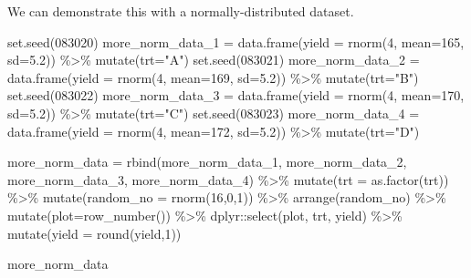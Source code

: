 \documentclass[
]{book}
\newenvironment{Shaded}{\begin{snugshade}}{\end{snugshade}}
\newcommand{\AttributeTok}[1]{\textcolor[rgb]{0.77,0.63,0.00}{#1}}
\newcommand{\DecValTok}[1]{\textcolor[rgb]{0.00,0.00,0.81}{#1}}
\newcommand{\FloatTok}[1]{\textcolor[rgb]{0.00,0.00,0.81}{#1}}
\newcommand{\FunctionTok}[1]{\textcolor[rgb]{0.00,0.00,0.00}{#1}}
\newcommand{\NormalTok}[1]{#1}
\newcommand{\OtherTok}[1]{\textcolor[rgb]{0.56,0.35,0.01}{#1}}
\newcommand{\SpecialCharTok}[1]{\textcolor[rgb]{0.00,0.00,0.00}{#1}}
\newcommand{\StringTok}[1]{\textcolor[rgb]{0.31,0.60,0.02}{#1}}
\begin{document}
We can demonstrate this with a normally-distributed dataset.

\begin{Shaded}
\begin{Highlighting}[]
\FunctionTok{set.seed}\NormalTok{(}\DecValTok{083020}\NormalTok{)}
\NormalTok{more\_norm\_data\_1 }\OtherTok{=} \FunctionTok{data.frame}\NormalTok{(}\AttributeTok{yield =} \FunctionTok{rnorm}\NormalTok{(}\DecValTok{4}\NormalTok{, }\AttributeTok{mean=}\DecValTok{165}\NormalTok{, }\AttributeTok{sd=}\FloatTok{5.2}\NormalTok{)) }\SpecialCharTok{\%\textgreater{}\%}
        \FunctionTok{mutate}\NormalTok{(}\AttributeTok{trt=}\StringTok{"A"}\NormalTok{)}
\FunctionTok{set.seed}\NormalTok{(}\DecValTok{083021}\NormalTok{)}
\NormalTok{more\_norm\_data\_2 }\OtherTok{=} \FunctionTok{data.frame}\NormalTok{(}\AttributeTok{yield =} \FunctionTok{rnorm}\NormalTok{(}\DecValTok{4}\NormalTok{, }\AttributeTok{mean=}\DecValTok{169}\NormalTok{, }\AttributeTok{sd=}\FloatTok{5.2}\NormalTok{)) }\SpecialCharTok{\%\textgreater{}\%}
        \FunctionTok{mutate}\NormalTok{(}\AttributeTok{trt=}\StringTok{"B"}\NormalTok{)}
\FunctionTok{set.seed}\NormalTok{(}\DecValTok{083022}\NormalTok{)}
\NormalTok{more\_norm\_data\_3 }\OtherTok{=} \FunctionTok{data.frame}\NormalTok{(}\AttributeTok{yield =} \FunctionTok{rnorm}\NormalTok{(}\DecValTok{4}\NormalTok{, }\AttributeTok{mean=}\DecValTok{170}\NormalTok{, }\AttributeTok{sd=}\FloatTok{5.2}\NormalTok{)) }\SpecialCharTok{\%\textgreater{}\%}
        \FunctionTok{mutate}\NormalTok{(}\AttributeTok{trt=}\StringTok{"C"}\NormalTok{)}
\FunctionTok{set.seed}\NormalTok{(}\DecValTok{083023}\NormalTok{)}
\NormalTok{more\_norm\_data\_4 }\OtherTok{=} \FunctionTok{data.frame}\NormalTok{(}\AttributeTok{yield =} \FunctionTok{rnorm}\NormalTok{(}\DecValTok{4}\NormalTok{, }\AttributeTok{mean=}\DecValTok{172}\NormalTok{, }\AttributeTok{sd=}\FloatTok{5.2}\NormalTok{)) }\SpecialCharTok{\%\textgreater{}\%}
        \FunctionTok{mutate}\NormalTok{(}\AttributeTok{trt=}\StringTok{"D"}\NormalTok{)}

\NormalTok{more\_norm\_data }\OtherTok{=} \FunctionTok{rbind}\NormalTok{(more\_norm\_data\_1, more\_norm\_data\_2, more\_norm\_data\_3, more\_norm\_data\_4) }\SpecialCharTok{\%\textgreater{}\%}
        \FunctionTok{mutate}\NormalTok{(}\AttributeTok{trt =} \FunctionTok{as.factor}\NormalTok{(trt)) }\SpecialCharTok{\%\textgreater{}\%}   
  \FunctionTok{mutate}\NormalTok{(}\AttributeTok{random\_no =} \FunctionTok{rnorm}\NormalTok{(}\DecValTok{16}\NormalTok{,}\DecValTok{0}\NormalTok{,}\DecValTok{1}\NormalTok{)) }\SpecialCharTok{\%\textgreater{}\%}
  \FunctionTok{arrange}\NormalTok{(random\_no) }\SpecialCharTok{\%\textgreater{}\%}
  \FunctionTok{mutate}\NormalTok{(}\AttributeTok{plot=}\FunctionTok{row\_number}\NormalTok{()) }\SpecialCharTok{\%\textgreater{}\%} 
\NormalTok{  dplyr}\SpecialCharTok{::}\FunctionTok{select}\NormalTok{(plot, trt, yield) }\SpecialCharTok{\%\textgreater{}\%}
  \FunctionTok{mutate}\NormalTok{(}\AttributeTok{yield =} \FunctionTok{round}\NormalTok{(yield,}\DecValTok{1}\NormalTok{))}

\NormalTok{more\_norm\_data}
\end{Highlighting}
\end{Shaded}
\end{document}
